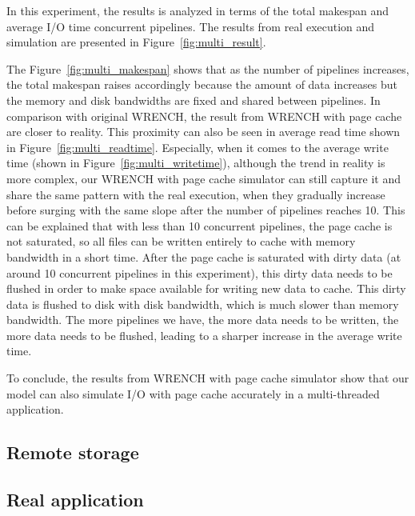 \documentclass[conference]{IEEEtran}
\begin{document}
			In this experiment, the results is analyzed in terms of the total makespan  
			and average I/O time concurrent pipelines.
			The results from real execution and simulation are presented in Figure~\ref{fig:multi_result}.
			
			The Figure~\ref{fig:multi_makespan} shows that as the number of pipelines 
			increases, the total makespan raises accordingly because the amount of data 
			increases but the memory and disk bandwidths are fixed and shared between pipelines. 
			In comparison with original WRENCH, the result from WRENCH with page cache are closer 
			to reality. 
			This proximity can also be seen in average read time shown in 
			Figure~\ref{fig:multi_readtime}. 
			Especially, when it comes to the average write time 
			(shown in Figure~\ref{fig:multi_writetime}), 
			although the trend in reality is more complex, our WRENCH with page cache 
			simulator can still capture it and share the same pattern with 
			the real execution, when they gradually increase before surging 
			with the same slope after the number of pipelines reaches 10. 
			This can be explained that with less than 10 concurrent pipelines, 
			the page cache is not saturated, so all files can be written entirely to 
			cache with memory bandwidth in a short time. 
			After the page cache is saturated with dirty data (at around 
			10 concurrent pipelines in this experiment), this dirty data needs 
			to be flushed in order to make space available for writing new data to cache. 
			This dirty data is flushed to disk with disk bandwidth, which is much  
			slower than memory bandwidth. 
			The more pipelines we have, the more data needs to be written, the more data 
			needs to be flushed, leading to a sharper increase in the average write time. 
			
			To conclude, the results from WRENCH with page cache simulator show that 
			our model can also simulate I/O with page cache accurately in a 
			multi-threaded application.  
			
		\subsection{Remote storage}
		
		\subsection{Real application}
\end{document}
